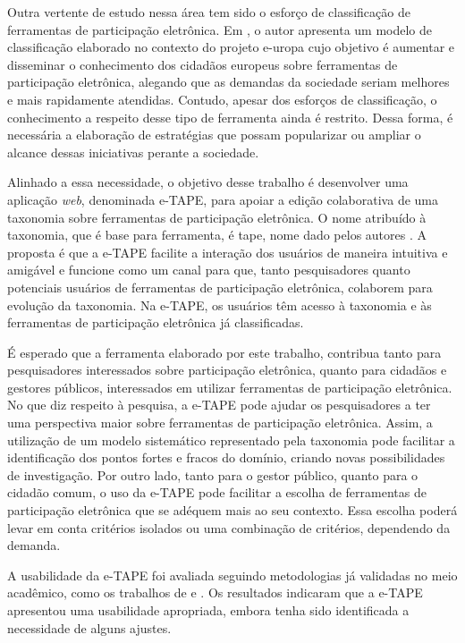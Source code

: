 \par
Outra vertente de estudo nessa área tem sido o esforço de classificação de ferramentas de participação eletrônica. Em  , o autor apresenta um modelo 
de classificação elaborado no contexto do projeto \acrfull{e-uropa} cujo objetivo é aumentar e disseminar o conhecimento dos cidadãos europeus sobre ferramentas de participação 
eletrônica, alegando que as demandas da sociedade seriam melhores e mais rapidamente atendidas. Contudo, apesar dos esforços de classificação, o conhecimento a respeito desse 
tipo de ferramenta ainda é restrito. Dessa forma, é necessária a elaboração de estratégias que possam popularizar ou ampliar o alcance dessas iniciativas perante a sociedade.

\par
Alinhado a essa necessidade, o objetivo desse trabalho é desenvolver uma aplicação \textit{web}, denominada e-TAPE, para apoiar a edição colaborativa de uma taxonomia sobre 
ferramentas de participação eletrônica. O nome atribuído à taxonomia, que é base para ferramenta, é \acrfull{tape}, nome dado pelos autores . 
A proposta é que a e-TAPE facilite a interação dos usuários de maneira intuitiva e amigável e funcione como um canal para que, tanto pesquisadores quanto potenciais usuários de
ferramentas de participação eletrônica, colaborem para evolução da taxonomia. Na e-TAPE, os usuários têm acesso à taxonomia e às ferramentas de participação eletrônica já classificadas.

\par
É esperado que a ferramenta elaborado por este trabalho, contribua tanto para pesquisadores interessados sobre participação eletrônica, quanto para cidadãos e gestores públicos, interessados em
utilizar ferramentas de participação eletrônica. No que diz respeito à pesquisa, a e-TAPE pode ajudar os pesquisadores a ter uma perspectiva maior sobre ferramentas de participação eletrônica. 
Assim, a utilização de um modelo sistemático representado pela taxonomia pode facilitar a identificação dos pontos fortes e fracos do domínio, 
criando novas possibilidades de investigação. Por outro lado, tanto para o gestor público, quanto para o cidadão comum, o uso da e-TAPE pode facilitar a escolha de ferramentas de participação 
eletrônica que se adéquem mais ao seu contexto. Essa escolha poderá levar em conta critérios isolados ou uma combinação de critérios, dependendo da demanda. 

\par
A usabilidade da e-TAPE foi avaliada seguindo metodologias já validadas no meio acadêmico, como os trabalhos de  e . Os resultados indicaram que a e-TAPE apresentou uma usabilidade apropriada, embora tenha sido identificada a necessidade de alguns ajustes. 

